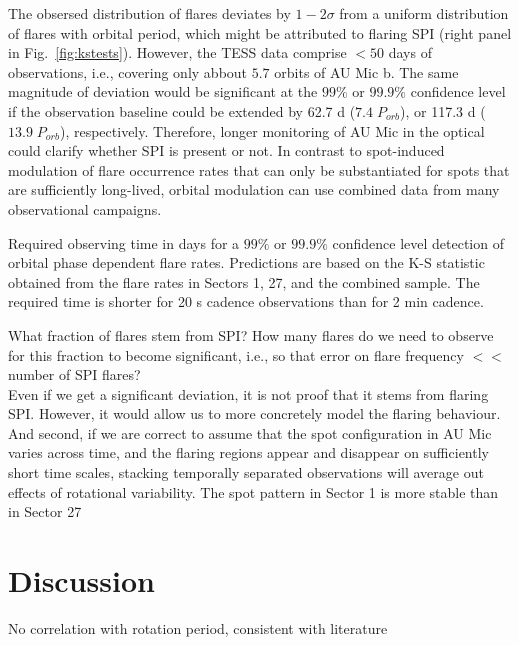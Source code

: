 \documentclass[fleqn,usenatbib,letters]{mnras}%
\begin{document}
The obsersed distribution of flares deviates by $1-2\sigma$ from a uniform distribution of flares with orbital period, which might be attributed to flaring SPI (right panel in Fig.~\ref{fig:kstests}). However, the TESS data comprise $<50$ days of observations, i.e., covering only abbout $5.7$ orbits of AU Mic b. The same magnitude of deviation would be significant at the $99\%$ or  $99.9\%$ confidence level if the observation baseline could be extended by  62.7 d ($7.4\;P_{orb}$), or 117.3 d ($13.9\;P_{orb}$), respectively. Therefore, longer monitoring of AU Mic in the optical could clarify whether SPI is present or not. In contrast to spot-induced modulation of flare occurrence rates that can only be substantiated for spots that are sufficiently long-lived, orbital modulation can use combined data from many observational campaigns. 
\begin{table}
\caption{Required observing time in days for a $99\%$ or $99.9\%$ confidence level detection of orbital phase dependent flare rates. Predictions are based on the K-S statistic obtained from the flare rates in Sectors 1, 27, and the combined sample. The required time is shorter for 20 s cadence observations than for 2 min cadence.}
\centering

\label{tab:prediction}
\end{table}
What fraction of flares stem from SPI? How many flares do we need to observe for this fraction to become significant, i.e., so that error on flare frequency $<<$ number of SPI flares?
\\
Even if we get a significant deviation, it is not proof that it stems from flaring SPI. However, it would allow us to more concretely model the flaring behaviour. And second, if we are correct to assume that the spot configuration in AU Mic varies across time, and the flaring regions appear and disappear on sufficiently short time scales, stacking temporally separated observations will average out effects of rotational variability. The spot pattern in Sector 1 is more stable than in Sector 27~\citep{martioli2021}
\section{Discussion}
No correlation with rotation period, consistent with literature~\citep{doyle2018, doyle2019}
\end{document}
